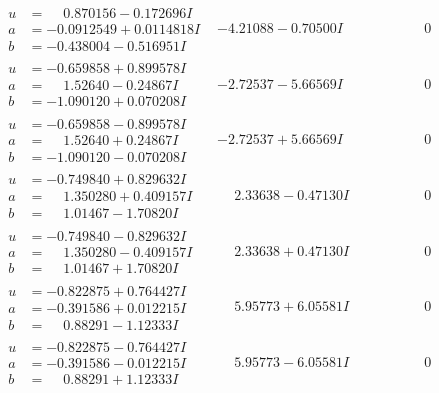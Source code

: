 \documentclass[1p]{elsarticle_modified}
\theoremstyle{definition}
\begin{document}
$$\begin{array}{c|c|c}
\begin{aligned}
u &= \phantom{-}0.870156 - 0.172696 I \\
a &= -0.0912549 + 0.0114818 I \\
b &= -0.438004 - 0.516951 I\end{aligned}
 & -4.21088 - 0.70500 I & \phantom{-0.000000 } 0 \\ \hline\begin{aligned}
u &= -0.659858 + 0.899578 I \\
a &= \phantom{-}1.52640 - 0.24867 I \\
b &= -1.090120 + 0.070208 I\end{aligned}
 & -2.72537 - 5.66569 I & \phantom{-0.000000 } 0 \\ \hline\begin{aligned}
u &= -0.659858 - 0.899578 I \\
a &= \phantom{-}1.52640 + 0.24867 I \\
b &= -1.090120 - 0.070208 I\end{aligned}
 & -2.72537 + 5.66569 I & \phantom{-0.000000 } 0 \\ \hline\begin{aligned}
u &= -0.749840 + 0.829632 I \\
a &= \phantom{-}1.350280 + 0.409157 I \\
b &= \phantom{-}1.01467 - 1.70820 I\end{aligned}
 & \phantom{-}2.33638 - 0.47130 I & \phantom{-0.000000 } 0 \\ \hline\begin{aligned}
u &= -0.749840 - 0.829632 I \\
a &= \phantom{-}1.350280 - 0.409157 I \\
b &= \phantom{-}1.01467 + 1.70820 I\end{aligned}
 & \phantom{-}2.33638 + 0.47130 I & \phantom{-0.000000 } 0 \\ \hline\begin{aligned}
u &= -0.822875 + 0.764427 I \\
a &= -0.391586 + 0.012215 I \\
b &= \phantom{-}0.88291 - 1.12333 I\end{aligned}
 & \phantom{-}5.95773 + 6.05581 I & \phantom{-0.000000 } 0 \\ \hline\begin{aligned}
u &= -0.822875 - 0.764427 I \\
a &= -0.391586 - 0.012215 I \\
b &= \phantom{-}0.88291 + 1.12333 I\end{aligned}
 & \phantom{-}5.95773 - 6.05581 I & \phantom{-0.000000 } 0 \\ \hline\begin{aligned}

\end{aligned}
\end{array}$$
\end{document}
